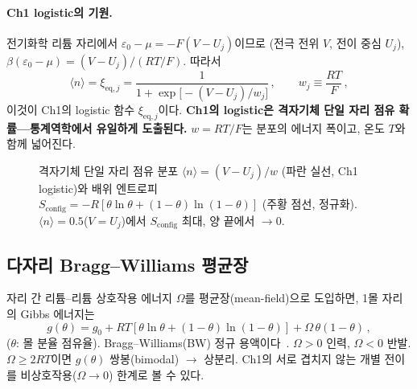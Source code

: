 \documentclass[11pt,a4paper]{article}
\newcommand{\eq}{\mathrm{eq}}
\newcommand{\config}{\mathrm{config}}
\begin{document}
\paragraph{Ch1 logistic의 기원.}
전기화학 리튬 자리에서 $\varepsilon_0-\mu = -F(V-U_j)$이므로
(전극 전위 $V$, 전이 중심 $U_j$),
$\beta(\varepsilon_0-\mu)=(V-U_j)/(RT/F)$. 따라서
\begin{equation}
  \langle n\rangle=\xi_{\eq,j}
    =\frac{1}{1+\exp\!\bigl[-(V-U_j)/w_j\bigr]}\,,
    \qquad w_j\equiv\frac{RT}{F}\,,
  \label{eq:logistic}
\end{equation}
이것이 Ch1의 logistic 함수 $\xi_{\eq,j}$이다.
\textbf{Ch1의 logistic은 격자기체 단일 자리 점유 확률---통계역학에서 유일하게 도출된다.}
$w=RT/F$는 분포의 에너지 폭이고, 온도 $T$와 함께 넓어진다.

\begin{figure}[h]
\centering
\caption{격자기체 단일 자리 점유 분포 $\langle n\rangle=(V-U_j)/w$ (파란 실선, Ch1 logistic)와
  배위 엔트로피 $S_\config=-R[\theta\ln\theta+(1-\theta)\ln(1-\theta)]$ (주황 점선, 정규화).
  $\langle n\rangle=0.5$($V=U_j$)에서 $S_\config$ 최대, 양 끝에서 $\to0$.}
\label{fig:FD_Sconfig}
\end{figure}

\subsection{다자리 Bragg--Williams 평균장}\label{ssec:BW}

자리 간 리튬--리튬 상호작용 에너지 $\Omega$를 평균장(mean-field)으로 도입하면,
1몰 자리의 Gibbs 에너지는
\begin{equation}
  g(\theta)=g_0+RT[\theta\ln\theta+(1-\theta)\ln(1-\theta)]+\Omega\,\theta(1-\theta)\,,
  \label{eq:BW}
\end{equation}
($\theta$: 몰 분율 점유율). Bragg--Williams(BW) 정규 용액이다~\cite{huggins2009,bazant2013}.
$\Omega>0$ 인력, $\Omega<0$ 반발. $\Omega\ge2RT$이면 $g(\theta)$ 쌍봉(bimodal) $\to$ 상분리.
Ch1의 서로 겹치지 않는 개별 전이를 비상호작용($\Omega\to0$) 한계로 볼 수 있다.
\end{document}
